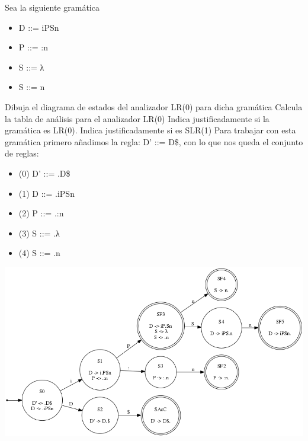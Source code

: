 \begin{problem}
Sea la siguiente gramática

\begin{itemize}
\item D ::= iPSn
\item P ::= :n
\item S ::= λ
\item S ::= n
\end{itemize}

\ppart Dibuja el diagrama de estados del analizador LR(0) para dicha gramática
\ppart Calcula la tabla de análisis para el analizador LR(0)
\ppart Indica justificadamente si la gramática es LR(0). Indica justificadamente si es SLR(1)
\solution
Para trabajar con esta gramática primero añadimos la regla: D' ::= D\$, con lo que nos queda el conjunto de reglas:
\begin{itemize}
\item (0) D' ::= .D\$
\item (1) D ::= .iPSn
\item (2) P ::= .:n
\item (3) S ::= .λ
\item (4) S ::= .n
\end{itemize}
\ppart
\begin{center}
\includegraphics[scale=0.65]{tex/ejerciciosHoja3/automata_H3E4.png}
\end{center}


\end{problem}
